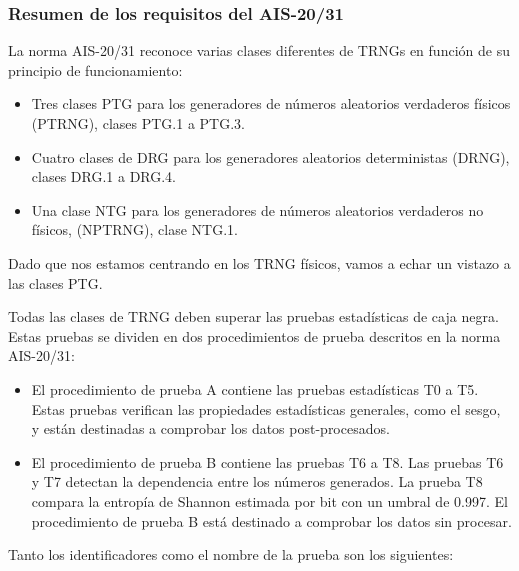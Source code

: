             \subsubsection{Resumen de los requisitos del AIS-20/31}
	
                La norma AIS-20/31 reconoce varias clases diferentes de TRNGs en función de su principio de funcionamiento:
                
                \begin{itemize}[noitemsep]
                    \item Tres clases PTG para los generadores de números aleatorios verdaderos físicos (PTRNG), clases PTG.1 a PTG.3.
                    \item Cuatro clases de DRG para los generadores aleatorios deterministas (DRNG), clases DRG.1 a DRG.4.
                    \item Una clase NTG para los generadores de números aleatorios verdaderos no físicos, (NPTRNG), clase NTG.1.
                \end{itemize}
                
                Dado que nos estamos centrando en los TRNG físicos, vamos a echar un vistazo a las clases PTG.
                
                Todas las clases de TRNG deben superar las pruebas estadísticas de caja negra. Estas pruebas se dividen en dos procedimientos de prueba descritos en la norma AIS-20/31:

                \begin{itemize}[noitemsep]
                    \item El procedimiento de prueba A contiene las pruebas estadísticas T0 a T5. Estas pruebas verifican las propiedades estadísticas generales, como el sesgo, y están destinadas a comprobar los datos post-procesados.
                    \item El procedimiento de prueba B contiene las pruebas T6 a T8. Las pruebas T6 y T7 detectan la dependencia entre los números generados. La prueba T8 compara la entropía de Shannon estimada por bit con un umbral de 0.997. El procedimiento de prueba B está destinado a comprobar los datos sin procesar.
                \end{itemize}		

                Tanto los identificadores como el nombre de la prueba son los siguientes:


